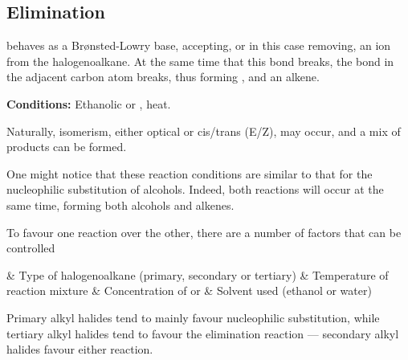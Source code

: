 
		\pagebreak
		\hypertarget{HydrogenHalideElimination}{}
		\subsection{Elimination}

			 behaves as a Brønsted-Lowry base, accepting, or in this case removing, an  ion from the halogenoalkane.
			At the same time that this  bond breaks, the  bond in the adjacent carbon atom breaks, thus forming
			, and an alkene.

			\vspace{1.5em}
			\vbox{\textbf{Conditions:}	\tabto{35mm}Ethanolic  or , heat.}


			Naturally, isomerism, either optical or cis/trans (E/Z), may occur, and a mix of products can be formed.

			One might notice that these reaction conditions are similar to that for the nucleophilic substitution of alcohols. Indeed,
			both reactions will occur at the same time, forming both alcohols and alkenes.

			To favour one reaction over the other, there are a number of factors that can be controlled

			\begin{bulletlist}
				& Type of halogenoalkane (primary, secondary or tertiary)
				& Temperature of reaction mixture
				& Concentration of  or 
				& Solvent used (ethanol or water)
			\end{bulletlist}

			Primary alkyl halides tend to mainly favour nucleophilic substitution, while tertiary alkyl halides tend to favour the
			elimination reaction --- secondary alkyl halides favour either reaction.

